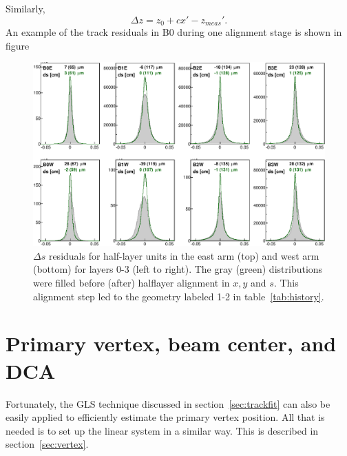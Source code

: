 \documentclass[12pt]{article}
\begin{document}
Similarly,
\begin{equation} \label{eq:dz}
\Delta z = z_0 + cx' - z_{meas}'.
\end{equation}
An example of the track residuals in B0 during one alignment stage is shown in figure
\begin{figure}[htb]
  \begin{center}
    \includegraphics[width=\textwidth]{11vs12/cls0}
  \end{center}
  \caption{$\Delta s$ residuals for half-layer units in the east arm (top) and west arm (bottom) for layers 0-3 (left to right). The gray (green) distributions were filled before (after) halflayer alignment in $x,y$ and $s$. This alignment step led to the geometry labeled 1-2 in table~\ref{tab:history}.}
  \label{fig:hlds}
\end{figure}

\section{Primary vertex, beam center, and DCA}
Fortunately, the GLS technique discussed in section~\ref{sec:trackfit} can also be easily applied to efficiently estimate the primary vertex position. All that is needed is to set up the linear system in a similar way. This is described in section~\ref{sec:vertex}.
\end{document}
